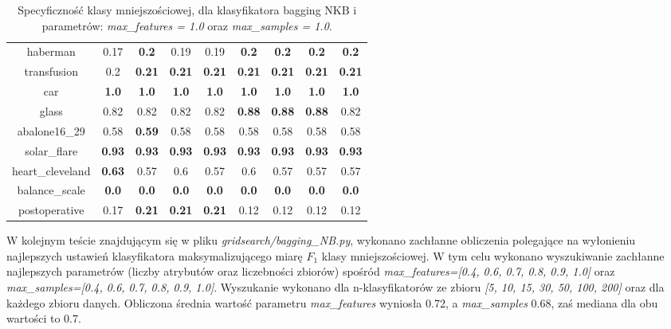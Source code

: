 \begin{table}[H]
\begin{center}
{\begin{tabular}{c|cccccccc}
					haberman&0.17&\textbf{0.2}&0.19&0.19&\textbf{0.2}&\textbf{0.2}&\textbf{0.2}&\textbf{0.2}\\%
					
					transfusion&0.2&\textbf{0.21}&\textbf{0.21}&\textbf{0.21}&\textbf{0.21}&\textbf{0.21}&\textbf{0.21}&\textbf{0.21}\\%
					
					car&\textbf{1.0}&\textbf{1.0}&\textbf{1.0}&\textbf{1.0}&\textbf{1.0}&\textbf{1.0}&\textbf{1.0}&\textbf{1.0}\\%
					
					glass&0.82&0.82&0.82&0.82&\textbf{0.88}&\textbf{0.88}&\textbf{0.88}&0.82\\%
					
					abalone16\_29&0.58&\textbf{0.59}&0.58&0.58&0.58&0.58&0.58&0.58\\%
					
					solar\_flare&\textbf{0.93}&\textbf{0.93}&\textbf{0.93}&\textbf{0.93}&\textbf{0.93}&\textbf{0.93}&\textbf{0.93}&\textbf{0.93}\\%
					
					heart\_cleveland&\textbf{0.63}&0.57&0.6&0.57&0.6&0.57&0.57&0.57\\%
					
					balance\_scale&\textbf{0.0}&\textbf{0.0}&\textbf{0.0}&\textbf{0.0}&\textbf{0.0}&\textbf{0.0}&\textbf{0.0}&\textbf{0.0}\\%
					
					postoperative&0.17&\textbf{0.21}&\textbf{0.21}&\textbf{0.21}&0.12&0.12&0.12&0.12\\%
					
				\end{tabular}}
				\caption{Specyficzność klasy mniejszościowej, dla klasyfikatora bagging NKB i parametrów: \textit{max\_features = 1.0} oraz \textit{max\_samples = 1.0}.}
				\label{bagging-specyficznosc11}
			\end{center}
		\end{table}
\par
W kolejnym teście znajdującym się w pliku \textit{gridsearch/bagging\_NB.py}, wykonano zachłanne obliczenia polegające na wyłonieniu najlepszych ustawień klasyfikatora maksymalizującego miarę $F_1$ klasy mniejszościowej. W tym celu wykonano wyszukiwanie zachłanne najlepszych parametrów (liczby atrybutów oraz liczebności zbiorów) spośród \textit{max\_features=[0.4, 0.6, 0.7, 0.8, 0.9, 1.0]} oraz \textit{max\_samples=[0.4, 0.6, 0.7, 0.8, 0.9, 1.0]}. Wyszukanie wykonano dla n-klasyfikatorów ze zbioru \textit{[5, 10, 15, 30, 50, 100, 200]} oraz dla każdego zbioru danych. Obliczona średnia wartość parametru \textit{max\_features} wyniosła 0.72, a \textit{max\_samples} 0.68, zaś mediana dla obu wartości to 0.7. \par
